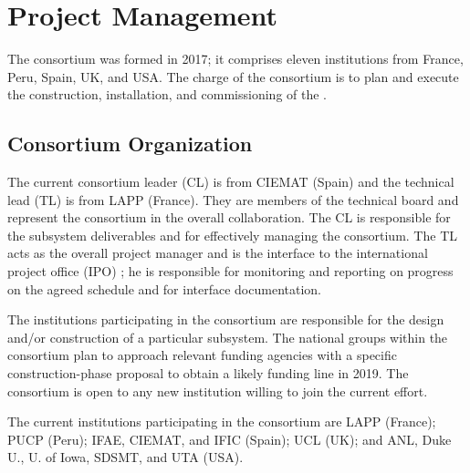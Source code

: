 \section{Project Management}
\label{sec:dp-pds-management}

The \dual {} consortium was formed in 2017;  it comprises eleven institutions from France, Peru, Spain, UK, and USA. The charge of the \dual {} consortium is to plan and execute the construction, installation, and commissioning of the  .

\subsection{Consortium Organization}

The current \dual {} consortium leader (CL)  is %
 from CIEMAT (Spain) and the technical lead (TL)  is %
 from LAPP (France). They are members of the  technical board and represent the consortium in the overall  collaboration. The CL is responsible for the subsystem deliverables and for effectively managing the consortium. The TL acts as the overall project manager and is the interface to the international project office (IPO) ; he is responsible for monitoring and reporting on progress on the agreed schedule and for interface documentation.

The institutions participating in the consortium are responsible for the design and/or construction of a particular subsystem. The national groups within the consortium plan to approach relevant funding agencies with a specific construction-phase proposal to obtain a likely funding line in 2019. The \dual {} consortium is open to any new institution willing to join the current effort.

The current institutions participating in the \dual {} consortium are LAPP (France); PUCP (Peru); IFAE, CIEMAT, and IFIC (Spain); UCL (UK); and ANL, Duke U., U. of Iowa, SDSMT, and UTA (USA).

